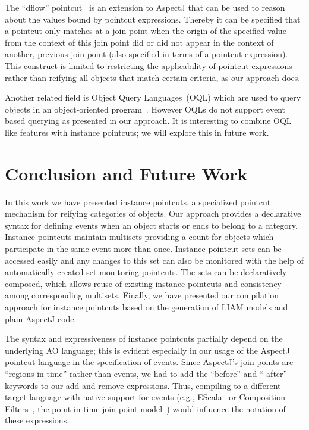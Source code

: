 \documentclass{acm_proc_article-sp}
\begin{document}
The ``dflow'' pointcut~\cite{kawauchi:aosd-aosdsec04} is an extension to AspectJ that can be used to reason about the values bound by pointcut expressions. Thereby it can be specified that a pointcut only matches at a join point when the origin of the specified value from the context of this join point did or did not appear in the context of another, previous join point (also specified in terms of a pointcut expression). This construct is limited to restricting the applicability of pointcut expressions rather than reifying all objects that match certain criteria, as our approach does.

Another related field is Object Query Languages~(OQL) which are used to query objects in an object-oriented program~\cite{cluet1998designing}. However OQLs do not support event based querying as presented in our approach. It is interesting to combine  OQL like features with instance pointcuts; we will explore this in future work. 


\section{Conclusion and Future Work}
In this work we have presented instance pointcuts, a specialized pointcut mechanism for reifying categories of objects. Our approach provides a declarative syntax for defining events when an object starts or ends to belong to a category. Instance pointcuts maintain multisets providing a count for objects which participate in the same event more than once. Instance pointcut sets can be accessed easily and any changes to this set can also be monitored with the help of automatically created set monitoring pointcuts. The sets can be declaratively composed, which allows reuse of existing instance pointcuts and consistency among corresponding multisets. Finally, we have presented our compilation approach for instance pointcuts based on the generation of LIAM models and plain AspectJ code.

The syntax and expressiveness of instance pointcuts partially depend on the underlying AO language; this is evident especially in our usage of the AspectJ pointcut language in the specification of events. Since AspectJ's join points are ``regions in time'' rather than events, we had to add the ``before'' and `` after'' keywords to our add and remove expressions. Thus, compiling to a different target language with native support for events (e.g., EScala~\cite{Gasiunas2011} or Composition Filters~\cite{Bergmans2001b}, the point-in-time join point model~\cite{masuharafine}) would influence the notation of these expressions.
\end{document}
